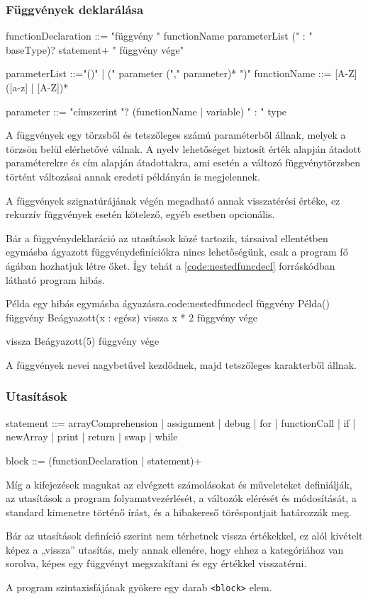 \subsubsection{Függvények deklarálása}
\label{sec:funcdecl}

\begin{ebnf}
functionDeclaration ::= 
    "függvény " functionName parameterList (" : " baseType)?
        statement+ 
    " függvény vége"

parameterList ::="()" | (" parameter ("," parameter)* ")"
functionName ::= [A-Z] ([a-z] | [A-Z])*

parameter ::=
    "címszerint "? (functionName | variable) " : " type
\end{ebnf}

A függvények egy törzsből és tetszőleges számú paraméterből állnak, melyek a törzsön belül elérhetővé válnak. A nyelv lehetőséget biztosít érték alapján átadott paraméterekre és cím alapján átadottakra, ami esetén a változó függvénytörzsben történt változásai annak eredeti példányán is megjelennek.

A függvények szignatúrájának végén megadható annak visszatérési értéke, ez rekurzív függvények esetén kötelező, egyéb esetben opcionális.

Bár a függvénydeklaráció az utasítások közé tartozik, társaival ellentétben egymásba ágyazott függvénydefiníciókra nincs lehetőségünk, csak a program fő ágában hozhatjuk létre őket. Így tehát a \ref{code:nestedfuncdecl} forráskódban látható program hibás.

\begin{code}{Példa egy hibás egymásba ágyazásra.}{code:nestedfuncdecl}
függvény Példa()
    függvény Beágyazott(x : egész)
        vissza x * 2
    függvény vége

    vissza Beágyazott(5)
függvény vége
\end{code}

A függvények nevei nagybetűvel kezdődnek, majd tetszőleges karakterből állnak.

\subsubsection{Utasítások}

\begin{ebnf}
statement ::= arrayComprehension 
    | assignment 
    | debug 
    | for 
    | functionCall 
    | if 
    | newArray 
    | print 
    | return 
    | swap 
    | while

block ::= (functionDeclaration | statement)+
\end{ebnf}

Míg a kifejezések magukat az elvégzett számolásokat és műveleteket definiálják, az utasítások a program folyamatvezérlését, a változók elérését és módosítását, a standard kimenetre történő írást, és a hibakereső töréspontjait határozzák meg.

Bár az utasítások definíció szerint nem térhetnek vissza értékekkel, ez alól kivételt képez a „vissza” utasítás, mely annak ellenére, hogy ehhez a kategóriához van sorolva, képes egy függvényt megszakítani és egy értékkel visszatérni.

A program szintaxisfájának gyökere egy darab \texttt{<block>} elem.